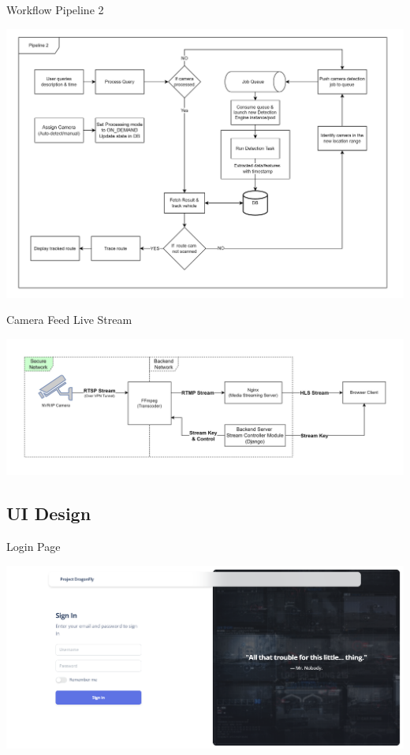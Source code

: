 \documentclass{beamer}
\begin{document}
	\begin{frame}{Workflow Pipeline 2}
		\begin{center}
			\includegraphics[width=\linewidth]{res/pipeline2}
		\end{center}
	\end{frame}

	\begin{frame}{Camera Feed Live Stream}
		\begin{center}
			\includegraphics[width=\linewidth]{res/live_stream_arch.jpg}
		\end{center}
	\end{frame}
		
	\subsection{UI Design}
	\begin{frame}{Login Page}
		\begin{center}
			 \includegraphics[width=\linewidth]{res/login.png}
		\end{center}
 	\end{frame}
	 
\end{document}
